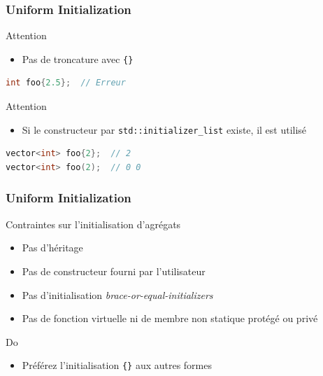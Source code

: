 \documentclass[C++.tex]{subfiles}
\begin{document}
\begin{frame}[fragile]
	\frametitle{Uniform Initialization}
	\begin{alertblock}{Attention}
		\begin{itemize}
			\item Pas de troncature avec \lstinline|{}|
		\end{itemize}

		\begin{lstlisting}[language=C++]
int foo{2.5};  // Erreur\end{lstlisting}
	\end{alertblock}

	\pause

	\begin{alertblock}{Attention}
		\begin{itemize}
			\item Si le constructeur par \lstinline|std::initializer_list| existe, il est utilisé
		\end{itemize}

		\begin{lstlisting}[language=C++]
vector<int> foo{2};  // 2
vector<int> foo(2);  // 0 0\end{lstlisting}
	\end{alertblock}
\end{frame}

\begin{frame}[fragile]
	\frametitle{Uniform Initialization}
	\begin{alertblock}{Contraintes sur l'initialisation d'agrégats}
		\begin{itemize}
			\item Pas d'héritage
			\item Pas de constructeur fourni par l'utilisateur
			\item Pas d'initialisation \textit{brace-or-equal-initializers}
			\item Pas de fonction virtuelle ni de membre non statique protégé ou privé
		\end{itemize}

	\end{alertblock}

	\begin{exampleblock}{Do}
		\begin{itemize}
			\item Préférez l'initialisation \lstinline|{}| aux autres formes
		\end{itemize}
	\end{exampleblock}
\end{frame}
\end{document}
